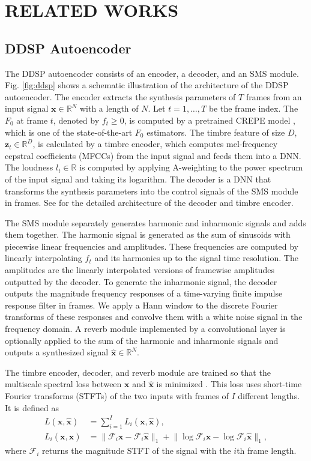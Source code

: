 \documentclass{article}
\def\R{\mathbb{R}}
\begin{document}
\section{RELATED WORKS}
\label{sec:relatedwork}
\subsection{DDSP Autoencoder}
\label{sec:ddsp}
The DDSP autoencoder consists of an encoder, a decoder, and an SMS module.
Fig. \ref{fig:ddsp} shows a schematic illustration of the architecture of the DDSP autoencoder.
The encoder extracts the synthesis parameters of $T$ frames from an input signal $\bm{x}\in \R^{N}$ with a length of $N$.
Let $t=1,\ldots,T$ be the frame index.
The $F_0$ at frame $t$, denoted by $f_t\geq 0$, is computed by a pretrained CREPE model \cite{crepe}, which is one of the state-of-the-art $F_0$ estimators. The timbre feature of size $D$, $\bm{z}_t\in\R^D$, is calculated by a timbre encoder, which computes mel-frequency cepstral coefficients (MFCCs) from the input signal and feeds them into a DNN.
The loudness $l_t\in\R$ is computed by applying A-weighting to the power spectrum of the input signal and taking its logarithm.
The decoder is a DNN that transforms the synthesis parameters into the control signals of the SMS module in frames. See \cite{ddsp_ref} for the detailed architecture of the decoder and timbre encoder.

The SMS module 
separately generates harmonic and inharmonic signals and adds them together.
The harmonic signal is generated as the sum of sinusoids with piecewise linear frequencies and amplitudes.
These frequencies are computed by linearly interpolating $f_{t}$ and its harmonics up to the signal time resolution. The amplitudes are the linearly interpolated versions of framewise amplitudes outputted by the decoder.
To generate the inharmonic signal, the decoder outputs the magnitude frequency responses of a time-varying finite impulse response filter in frames.
We apply a Hann window to the discrete Fourier transforms of these responses and convolve them with a white noise signal in the frequency domain.
A reverb module implemented by a convolutional layer is optionally applied to the sum of the harmonic and inharmonic signals and outputs a synthesized signal $\bm{\hat{x}}\in\R^{N}$.

The timbre encoder, decoder, and reverb module are trained so that the multiscale spectral loss between $\bm{x}$ and $\bm{\hat{x}}$ is minimized \cite{ddsp_ref}.
This loss uses short-time Fourier transforms (STFTs) of the two inputs with frames of $I$ different lengths.
It is defined as
\begin{align}
    L(\bm{x},\bm{\hat{x}}) &= \sum_{i=1}^{I}L_i(\bm{x},\bm{\hat{x}}), \label{eq:mss_loss}\\
    L_i(\bm{x},\bm{\hat{x}}) &= \lVert \mathcal{F}_i\bm{x} - \mathcal{F}_i\bm{\hat{x}}\rVert_1 + \lVert \log \mathcal{F}_i\bm{x} - \log \mathcal{F}_i \bm{\hat{x}}\rVert_1,
\end{align}
where $\mathcal{F}_i$ returns the magnitude STFT of the signal with the $i$th frame length.
\end{document}
